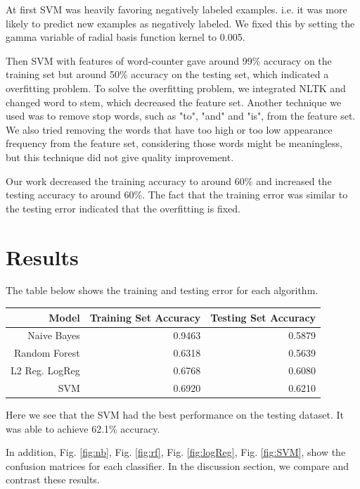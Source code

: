 \documentclass[journal]{IEEEtran}
\begin{document}
At first SVM was heavily favoring negatively labeled examples. i.e. it was more likely to predict new examples as negatively labeled. We fixed this by setting the gamma variable of radial basis function kernel to 0.005.

Then SVM with features of word-counter gave around 99\% accuracy on the training set but around 50\% accuracy on the testing set, which indicated a overfitting problem. To solve the overfitting problem, we integrated NLTK and changed word to stem, which decreased the feature set. Another technique we used was to remove stop words, such as "to", "and" and "is", from the feature set. We also tried removing the words that have too high or too low appearance frequency from the feature set, considering those words might be meaningless, but this technique did not give quality improvement.

Our work decreased the training accuracy to around 60\% and increased the testing accuracy to around 60\%. The fact that the training error was similar to the testing error indicated that the overfitting is fixed. 

\section{Results}

The table below shows the training and testing error for each algorithm. 

\begin{table}[ht]
\centering
\begin{tabular}{rrr}
  \hline
Model & Training Set Accuracy & Testing Set Accuracy \\
  \hline
Naive Bayes &	0.9463 & 0.5879	\\
Random Forest & 0.6318 &  0.5639	 \\
L2 Reg. LogReg  &	0.6768 &	0.6080 \\
SVM & 0.6920 &  0.6210 \\
   \hline
\end{tabular}
\end{table}

Here we see that the SVM had the best performance on the testing dataset. It was able to achieve 62.1\% accuracy.

In addition, Fig.  \ref{fig:nb}, Fig.  \ref{fig:rf}, Fig.  \ref{fig:logReg}, Fig.  \ref{fig:SVM}, show the confusion matrices for each classifier. In the discussion section, we compare and contrast these results.
\end{document}
